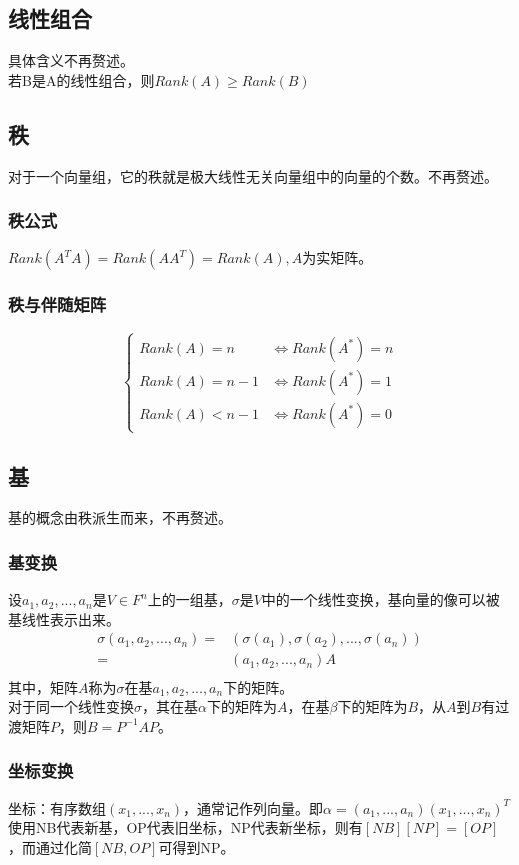 \documentclass[UTF8]{ctexart}
\begin{document}
	\subsection{线性组合}
	具体含义不再赘述。\\
	\indent
	若B是A的线性组合，则$Rank(A)\geq Rank(B)$
	\subsection{秩}
	对于一个向量组，它的秩就是极大线性无关向量组中的向量的个数。不再赘述。
	\subsubsection{秩公式}
	$Rank(A^{T}A)=Rank(AA^{T})=Rank(A),A$为实矩阵。
	\subsubsection{秩与伴随矩阵}
	\begin{equation*}
	\begin{cases}
	Rank(A)=n &\Leftrightarrow Rank(A^{*})=n\\
	Rank(A)=n-1 &\Leftrightarrow Rank(A^{*})=1\\
	Rank(A)<n-1 &\Leftrightarrow Rank(A^{*})=0
	\end{cases}
	\end{equation*}
	\subsection{基}
	基的概念由秩派生而来，不再赘述。
	\subsubsection{基变换}
	设$a_1,a_2,...,a_n$是$V \in F^{n}$上的一组基，$\sigma$是$V$中的一个线性变换，基向量的像可以被基线性表示出来。
	\[
		\begin{split}
		\sigma(a_1,a_2,...,a_n) = & (\sigma(a_1),\sigma(a_2),...,\sigma(a_n))    \\
		= &(a_1,a_2,...,a_n)A \\
		\end{split}
	\]
	其中，矩阵$A$称为$\sigma$在基$a_1,a_2,...,a_n$下的矩阵。\\
	\indent
	对于同一个线性变换$\sigma$，其在基$\alpha$下的矩阵为$\mathit{A}$，在基$\beta$下的矩阵为$\mathit{B}$，从$\mathit{A}$到$\mathit{B}$有过渡矩阵$\mathit{P}$，则$\mathit{B}=\mathit{P^{-1}AP}$。
	\subsubsection{坐标变换}
	坐标：有序数组$(x_1,...,x_n)$，通常记作列向量。即$\alpha=(a_1,...,a_n)(x_1,...,x_n)^T$\\
	\indent
	使用NB代表新基，OP代表旧坐标，NP代表新坐标，则有$[NB][NP]=[OP]$，而通过化简$[NB,OP]$可得到NP。
\end{document}
